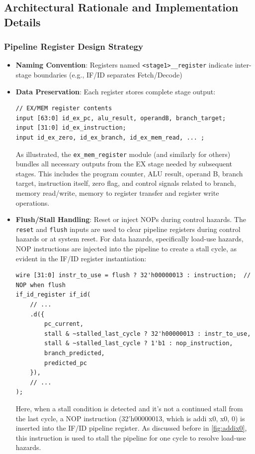 \documentclass{article}
\numberwithin{figure}{section}
\numberwithin{table}{section}
\begin{document}
\subsection{Architectural Rationale and Implementation Details}
\subsubsection{Pipeline Register Design Strategy}
\begin{itemize}
\item \textbf{Naming Convention}: Registers named \texttt{<stage1>\_<stage2>\_register} indicate inter-stage boundaries (e.g., IF/ID separates Fetch/Decode)
\item \textbf{Data Preservation}: Each register stores complete stage output:
\begin{lstlisting}[style=verilog-style]
// EX/MEM register contents
input [63:0] id_ex_pc, alu_result, operandB, branch_target;
input [31:0] id_ex_instruction;
input id_ex_zero, id_ex_branch, id_ex_mem_read, ... ;\end{lstlisting}
    As illustrated, the \texttt{ex\_mem\_register} module (and similarly for others) bundles all necessary outputs from the EX stage needed by subsequent stages. This includes the program counter, ALU result, operand B, branch target, instruction itself, zero flag, and control signals related to branch, memory read/write, memory to register transfer and register write operations.

\item \textbf{Flush/Stall Handling}: Reset or inject NOPs during control hazards. The \texttt{reset} and \texttt{flush} inputs are used to clear pipeline registers during control hazards or at system reset. For data hazards, specifically load-use hazards, NOP instructions are injected into the pipeline to create a stall cycle, as evident in the IF/ID register instantiation:
\begin{lstlisting}[style=verilog-style]
wire [31:0] instr_to_use = flush ? 32'h00000013 : instruction;  // NOP when flush
if_id_register if_id(
    // ...
    .d({
        pc_current,
        stall & ~stalled_last_cycle ? 32'h00000013 : instr_to_use, 
        stall & ~stalled_last_cycle ? 1'b1 : nop_instruction,
        branch_predicted,
        predicted_pc
    }),
    // ...
);\end{lstlisting}
    Here, when a stall condition is detected and it's not a continued stall from the last cycle, a NOP instruction (32'h00000013, which is addi x0, x0, 0) is inserted into the IF/ID pipeline register. As discussed before in  \ref{fig:addix0}, this instruction is used to stall the pipeline for one cycle to resolve load-use hazards.

\end{itemize}
\end{document}

